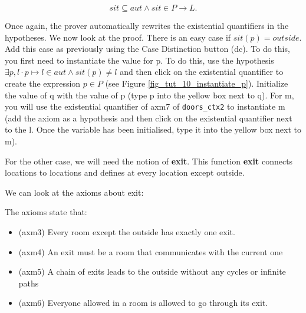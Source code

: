 \[
sit \subseteq aut \land sit \in P \mathbin \rightarrow L.
\]

Once again, the prover automatically rewrites the existential quantifiers in the hypotheses. We now look at the proof. There is an easy case if $sit(p) = outside$. Add this case as previously using the \textsf{Case Distinction button (dc)}. To do this, you first need to instantiate the value for p. To do this, use the hypothesis $\exists p, l \cdot p \mapsto l \in aut \land sit(p) \neq l$ and then click on the existential quantifier to create the expression $ p \in P $ (see Figure \ref{fig_tut_10_instantiate_p}). Initialize the value of \textsf{q} with the value of \textsf{p} (type p into the yellow box next to q). For \textsf{m}, you will use the existential quantifier of \textsf{axm7} of \texttt{doors\_ctx2} to instantiate \textsf{m} (add the axiom as a hypothesis and then click on the existential quantifier next to the l. Once the variable has been initialised, type it into the yellow box next to m).

For the other case, we will need the notion of \textbf{exit}. This function \textbf{exit} connects locations to locations and defines at every location except \textsf{outside}.

We can look at the axioms about \textsf{exit}:

\begin{description}
\AXIOMS
	\begin{description}
	\end{description}
\end{description}

The axioms state that:

\begin{itemize}
	\item (axm3) Every room except the outside has exactly one exit. 
	\item (axm4) An exit must be a room that communicates with the current one
	\item (axm5) A chain of exits leads to the outside without any cycles or infinite paths
	\item (axm6) Everyone allowed in a room is allowed to go through its exit. 
\end{itemize}  

